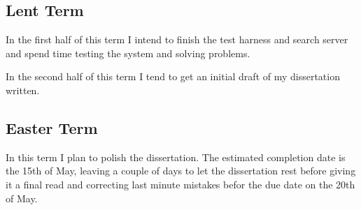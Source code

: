\subsection*{Lent Term}

In the first half of this term I intend to finish the test harness and search server and spend time testing the system and solving problems.

In the second half of this term I tend to get an initial draft of my dissertation written.


\subsection*{Easter Term}

In this term I plan to polish the dissertation. The estimated completion date is the 15th of May, leaving a couple of days to let the dissertation rest before giving it a final read and correcting last minute mistakes befor the due date on the 20th of May.
